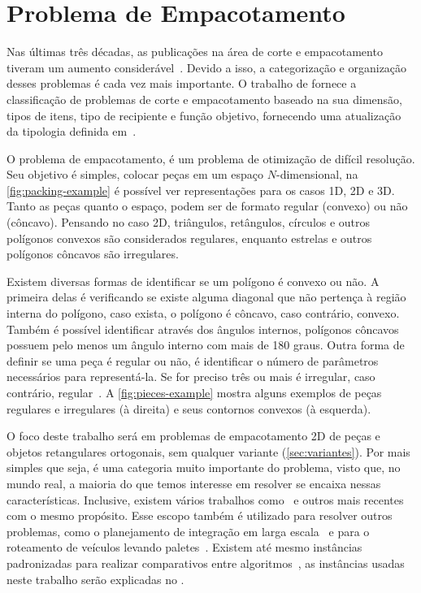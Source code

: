 \chapter{Problema de Empacotamento}\label{ch:problema-de-empacotamento}

Nas últimas três décadas, as publicações na área de corte e empacotamento tiveram um aumento
considerável~\cite{exact-solution-techniques,wascher2007improved}.
Devido a isso, a categorização e organização desses problemas é cada vez mais importante.
O trabalho de \citeauthor*{wascher2007improved} fornece a classificação de problemas de corte e
empacotamento baseado na sua dimensão, tipos de itens, tipo de recipiente e função objetivo,
fornecendo uma atualização da tipologia definida em~\cite{dyckhoff1990typology}.

O problema de empacotamento, é um problema de otimização de difícil resolução.
Seu objetivo é simples, colocar peças em um espaço $N$-dimensional, na \autoref{fig:packing-example}
é possível ver representações para os casos 1D, 2D e 3D\@.
Tanto as peças quanto o espaço, podem ser de formato regular (convexo) ou não (côncavo).
Pensando no caso 2D, triângulos, retângulos, círculos e outros polígonos convexos são
considerados regulares, enquanto estrelas e outros polígonos côncavos são irregulares.



Existem diversas formas de identificar se um polígono é convexo ou não.
A primeira delas é verificando se existe alguma diagonal que não pertença à região interna do
polígono, caso exista, o polígono é côncavo, caso contrário, convexo.
Também é possível identificar através dos ângulos internos, polígonos côncavos possuem pelo menos
um ângulo interno com mais de 180 graus.
Outra forma de definir se uma peça é regular ou não, é identificar o número de parâmetros
necessários para representá-la.
Se for preciso três ou mais é irregular, caso contrário, regular~\cite{aprendizado-reforco}.
A \autoref{fig:pieces-example} mostra alguns exemplos de peças regulares e irregulares (à direita)
e seus contornos convexos (à esquerda).



O foco deste trabalho será em problemas de empacotamento 2D de peças e objetos retangulares
ortogonais, sem qualquer variante (\autoref{sec:variantes}).
Por mais simples que seja, é uma categoria muito importante do problema, visto que, no mundo real,
a maioria do que temos interesse em resolver se encaixa nessas características.
Inclusive, existem vários trabalhos como~\cite{wei2011skyline} e outros mais recentes~\cite{
    martin2020models,firat2020effective,chen2019efficient} com o mesmo propósito.
Esse escopo também é utilizado para resolver outros problemas, como o planejamento de integração em
larga escala~\cite{huang2007efficient} e para o roteamento de veículos levando paletes~\cite{
    silva2022integer}.
Existem até mesmo instâncias padronizadas para realizar comparativos entre algoritmos~\cite{
    2DPackLib}, as instâncias usadas neste trabalho serão explicadas no .

